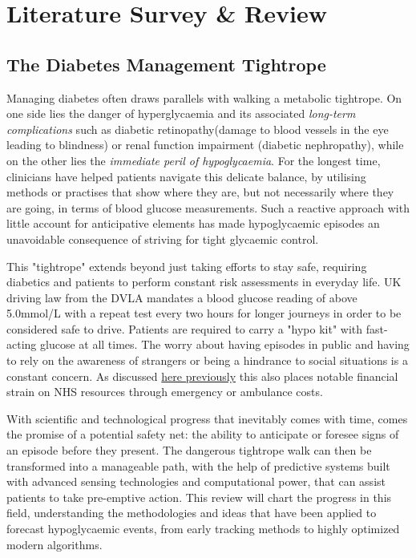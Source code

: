 
\section{Literature Survey \& Review} 

\subsection{The Diabetes Management Tightrope}

\noindent Managing diabetes often draws parallels with walking a metabolic tightrope. On one side lies the danger of hyperglycaemia and its associated \textit{long-term complications} such as diabetic retinopathy(damage to blood vessels in the eye leading to blindness) or renal function impairment (diabetic nephropathy), while on the other lies the \textit{immediate peril of hypoglycaemia}. For the longest time, clinicians have helped patients navigate this delicate balance, by utilising methods or practises that show where they are, but not necessarily where they are going, in terms of blood glucose measurements. Such a reactive approach with little account for anticipative elements has made hypoglycaemic episodes an unavoidable consequence of striving for tight glycaemic control. 

\vspace{5pt}
\noindent This "tightrope" extends beyond just taking efforts to stay safe, requiring diabetics and patients to perform constant risk assessments in everyday life. UK driving law from the DVLA mandates a blood glucose reading of above 5.0mmol/L with a repeat test every two hours for longer journeys in order to be considered safe to drive. Patients are required to carry a "hypo kit" with fast-acting glucose at all times. The worry about having episodes in public and having to rely on the awareness of strangers or being a hindrance to social situations is a constant concern. As discussed \hyperref[sec:clinicalOverview]{here previously} this also places notable financial strain on NHS resources through emergency or ambulance costs.

\vspace{5pt}
\noindent With scientific and technological progress that inevitably comes with time, comes the promise of a potential safety net: the ability to anticipate or foresee signs of an episode before they present. The dangerous tightrope walk can then be transformed into a manageable path, with the help of predictive systems built with advanced sensing technologies and computational power, that can assist patients to take pre-emptive action. This review will chart the progress in this field, understanding the methodologies and ideas that have been applied to forecast hypoglycaemic events, from early tracking methods to highly optimized modern algorithms.



